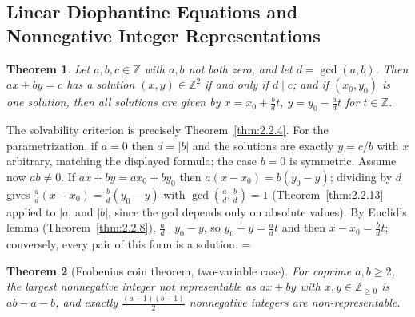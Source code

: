 \documentclass[11pt]{article}
\makeatletter
\theoremstyle{ntstyle}
\newtheorem{theorem}{Theorem}[subsection]
\let\nt@closedisplay\]
\def\nt@guardedclose{\@ifnextchar\par{\nt@closeafterpar}{\@ifnextchar\end{\postdisplaypenalty\@M\nt@closedisplay}{\nt@closedisplay}}}
\def\nt@closeafterpar\par{\@ifnextchar\par{\nt@closeafterpar}{\@ifnextchar\end{\postdisplaypenalty\@M\nt@closedisplay\par}{\nt@closedisplay\par}}}
\renewenvironment{proof}[1][\proofname]{\par
  \pushQED{\qed}\normalfont\topsep\medskipamount\edef\nt@afterproof{\@endparpenalty=\the\@endparpenalty\relax}\@beginparpenalty\@M\@endparpenalty\@M\let\]\nt@guardedclose\trivlist\item[]\textit{#1\@addpunct{.}} \ignorespaces}{\ifvmode\addpenalty\@M\fi\popQED\nt@afterproof\endtrivlist\@endpefalse}
\makeatother
\begin{document}
\subsection{Linear Diophantine Equations and Nonnegative Integer Representations}

\begin{theorem}\label{thm:2.6.1}
	Let $a,b,c\in\mathbb{Z}$ with $a,b$ not both zero, and let $d=\gcd(a, b)$. Then
	$ax+by=c$ has a solution $(x,y)\in\mathbb{Z}^{2}$ if and only if $d\mid c$; and if $(x_0,y_0)$
	is one solution, then all solutions are given by
	$x=x_0+\tfrac{b}{d}t,\ y=y_0-\tfrac{a}{d}t$ for $t\in\mathbb{Z}$.
\end{theorem}

\begin{proof} The solvability criterion is precisely Theorem~\ref{thm:2.2.4}. For the
parametrization, if $a=0$ then $d=|b|$ and the solutions are exactly $y=c/b$ with $x$ arbitrary,
matching the displayed formula; the case $b=0$ is symmetric. Assume now $ab\neq0$. If
$ax+by=ax_0+by_0$ then $a(x-x_0)=b(y_0-y)$; dividing by $d$ gives
$\tfrac{a}{d}(x-x_0)=\tfrac{b}{d}(y_0-y)$ with
	$\gcd(\tfrac{a}{d}, \tfrac{b}{d})=1$
	(Theorem~\ref{thm:2.2.13} applied to $|a|$ and $|b|$, since the gcd depends only on absolute
	values). By Euclid's lemma (Theorem~\ref{thm:2.2.8}), $\tfrac{a}{d}\mid
		y_0-y$, so $y_0-y=\tfrac{a}{d} t$ and then $x-x_0=\tfrac{b}{d} t$;
	conversely, every pair of this form is a solution.
\end{proof}
\begin{theorem}[Frobenius coin theorem, two-variable case]\label{thm:2.6.2} For coprime $a,b\ge2$, the largest nonnegative integer not
	representable as $ax+by$ with $x,y\in\mathbb{Z}_{\ge0}$ is $ab-a-b$, and
	exactly $\tfrac{(a-1)(b-1)}{2}$ nonnegative integers are non-representable.
\end{theorem}
\end{document}
